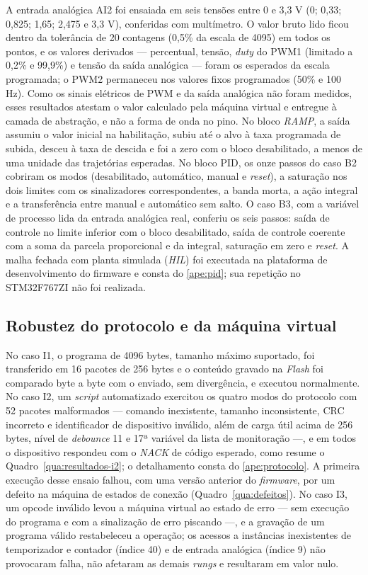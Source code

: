 A entrada analógica AI2 foi ensaiada em seis tensões entre 0 e 3,3 V (0; 0,33; 0,825; 1,65; 2,475 e 3,3 V), conferidas com multímetro.
O valor bruto lido ficou dentro da tolerância de 20 contagens (0,5\% da escala de 4095) em todos os pontos, e os valores derivados --- percentual, tensão, \textit{duty} do PWM1 (limitado a 0,2\% e 99,9\%) e tensão da saída analógica --- foram os esperados da escala programada; o PWM2 permaneceu nos valores fixos programados (50\% e 100 Hz).
Como os sinais elétricos de PWM e da saída analógica não foram medidos, esses resultados atestam o valor calculado pela máquina virtual e entregue à camada de abstração, e não a forma de onda no pino.
No bloco \textit{RAMP}, a saída assumiu o valor inicial na habilitação, subiu até o alvo à taxa programada de subida, desceu à taxa de descida e foi a zero com o bloco desabilitado, a menos de uma unidade das trajetórias esperadas.
No bloco PID, os onze passos do caso B2 cobriram os modos (desabilitado, automático, manual e \textit{reset}), a saturação nos dois limites com os sinalizadores correspondentes, a banda morta, a ação integral e a transferência entre manual e automático sem salto.
O caso B3, com a variável de processo lida da entrada analógica real, conferiu os seis passos: saída de controle no limite inferior com o bloco desabilitado, saída de controle coerente com a soma da parcela proporcional e da integral, saturação em zero e \textit{reset}.
A malha fechada com planta simulada (\textit{HIL}) foi executada na plataforma de desenvolvimento do firmware e consta do \ref{ape:pid}; sua repetição no STM32F767ZI não foi realizada.

\subsection{Robustez do protocolo e da máquina virtual}
\label{sub:resultados-robustez}

No caso I1, o programa de 4096 bytes, tamanho máximo suportado, foi transferido em 16 pacotes de 256 bytes e o conteúdo gravado na \textit{Flash} foi comparado byte a byte com o enviado, sem divergência, e executou normalmente.
No caso I2, um \textit{script} automatizado exercitou os quatro modos do protocolo com 52 pacotes malformados --- comando inexistente, tamanho inconsistente, CRC incorreto e identificador de dispositivo inválido, além de carga útil acima de 256 bytes, nível de \textit{debounce} 11 e 17ª variável da lista de monitoração ---, e em todos o dispositivo respondeu com o \textit{NACK} de código esperado, como resume o Quadro~\ref{qua:resultados-i2}; o detalhamento consta do \ref{ape:protocolo}.
A primeira execução desse ensaio falhou, com uma versão anterior do \textit{firmware}, por um defeito na máquina de estados de conexão (Quadro~\ref{qua:defeitos}).
No caso I3, um opcode inválido levou a máquina virtual ao estado de erro --- sem execução do programa e com a sinalização de erro piscando ---, e a gravação de um programa válido restabeleceu a operação; os acessos a instâncias inexistentes de temporizador e contador (índice 40) e de entrada analógica (índice 9) não provocaram falha, não afetaram as demais \textit{rungs} e resultaram em valor nulo.

